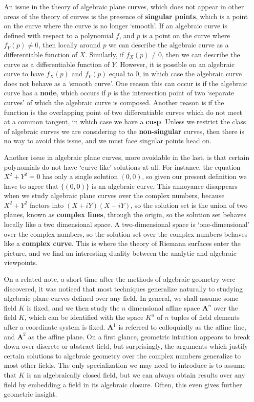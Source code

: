 An issue in the theory of algebraic plane curves, which does not appear in other areas of the theory of curves is the presence of {\bf singular points}, which is a point on the curve where the curve is no longer `smooth'. If an algebraic curve is defined with respect to a polynomial $f$, and $p$ is a point on the curve where $f_Y(p) \neq 0$, then locally around $p$ we can describe the algebraic curve as a differentiable function of $X$. Similarly, if $f_X(p) \neq 0$, then we can describe the curve as a differentiable function of $Y$. However, it is possible on an algebraic curve to have $f_X(p)$ and $f_Y(p)$ equal to 0, in which case the algebraic curve does not behave as a `smooth curve'. One reason this can occur is if the algebraic curve has a {\bf node}, which occurs if $p$ is the intersection point of two `separate curves' of which the algebraic curve is composed. Another reason is if the function is the overlapping point of two differentiable curves which do not meet at a common tangent, in which case we have a {\bf cusp}. Unless we restrict the class of algebraic curves we are considering to the {\bf non-singular} curves, then there is no way to avoid this issue, and we must face singular points head on.

Another issue in algebraic plane curves, more avoidable in the last, is that certain polynomials do not have `curve-like' solutions at all. For instance, the equation $X^2 + Y^2 = 0$ has only a single solution $(0,0)$, so given our present definition we have to agree that $\{ (0,0) \}$ is an algebraic curve. This annoyance disappears when we study algebraic plane curves over the complex numbers, because $X^2 + Y^2$ factors into $(X + iY)(X - iY)$, so the solution set is the union of two planes, known as {\bf complex lines}, through the origin, so the solution set behaves locally like a two dimensional space. A two-dimensional space is `one-dimensional' over the complex numbers, so the solution set over the complex numbers behaves like a {\bf complex curve}. This is where the theory of Riemann surfaces enter the picture, and we find an interesting duality between the analytic and algebraic viewpoints.

On a related note, a short time after the methods of algebraic geometry were discovered, it was noticed that most techniques generalize naturally to studying algebraic plane curves defined over any field. In general, we shall assume some field $K$ is fixed, and we then study the $n$ dimensional affine space $\mathbf{A}^n$ over the field $K$, which can be identified with the space $K^n$ of $n$ tuples of field elements after a coordinate system is fixed. $\mathbf{A}^1$ is referred to colloquially as the affine line, and $\mathbf{A}^2$ as the affine plane. On a first glance, geometric intuition appears to break down over discrete or abstract field, but surprisingly, the arguments which justify certain solutions to algebraic geometry over the complex numbers generalize to most other fields. The only specialization we may need to introduce is to assume that $K$ is an algebraically closed field, but we can always obtain results over any field by embedding a field in its algebraic closure. Often, this even gives further geometric insight.

